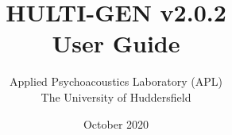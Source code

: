 \documentclass[oneside, a4paper,12pt]{book}
\begin{document}
\author{Applied Psychoacoustics Laboratory (APL) \\ The University of Huddersfield}
\title{HULTI-GEN v2.0.2 \\ User Guide}
\date{October 2020}

\maketitle
\cleardoublepage
\tableofcontents






\end{document}
